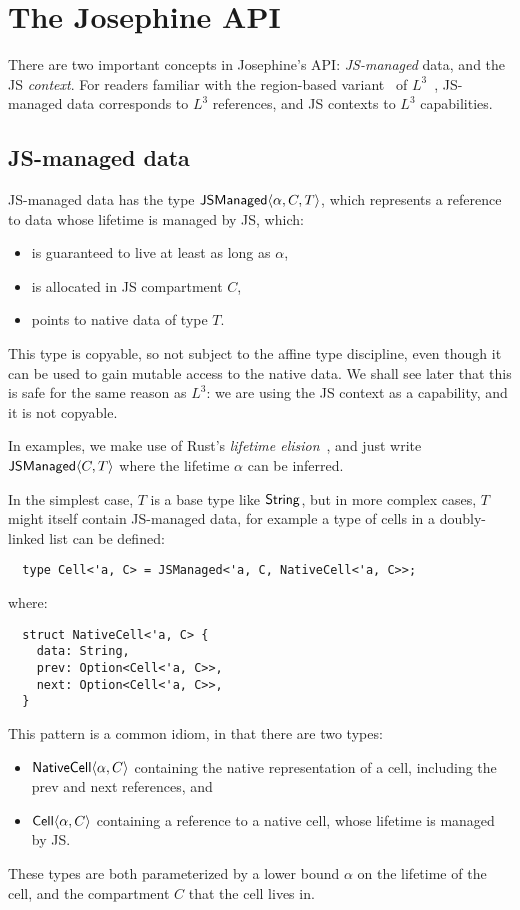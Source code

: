\section{The Josephine API}

There are two important concepts in Josephine's API: \emph{JS-managed} data,
and the JS \emph{context}. For readers familiar with the region-based
variant~\cite{l3-with-regions} of $L^3$~\cite{l3}, JS-managed data
corresponds to $L^3$ references, and JS contexts to $L^3$ capabilities.

\subsection{JS-managed data}

JS-managed data has the type $\mathsf{JSManaged}\langle \alpha, C, T\rangle$, which represents
a reference to data whose lifetime is managed by JS, which:
\begin{itemize}

\item is guaranteed to live at least as long as $\alpha$,
\item is allocated in JS compartment $C$,
\item points to native data of type $T$.
  
\end{itemize}
This type is copyable, so not subject to the affine type discipline,
even though it can be used to gain mutable access to the native
data. We shall see later that this is safe for the same reason as
$L^3$: we are using the JS context as a capability, and it is not
copyable.

In examples, we make use of Rust's \emph{lifetime elision}~\cite{???},
and just write $\mathsf{JSManaged}\langle C,T\rangle$ where the lifetime $\alpha$ can be
inferred.

In the simplest case, $T$ is a base type like $\mathsf{String}$, but in more complex
cases, $T$ might itself contain JS-managed data, for example a type of
cells in a doubly-linked list can be defined:
\begin{verbatim}
  type Cell<'a, C> = JSManaged<'a, C, NativeCell<'a, C>>;
\end{verbatim}
where:
\begin{verbatim}
  struct NativeCell<'a, C> {
    data: String,
    prev: Option<Cell<'a, C>>,
    next: Option<Cell<'a, C>>,
  }
\end{verbatim}
This pattern is a common idiom, in that there are two types:
\begin{itemize}
\item $\mathsf{NativeCell}\langle \alpha,C\rangle$ containing the native representation
of a cell, including the prev and next
references, and
\item $\mathsf{Cell}\langle \alpha,C\rangle$ containing a reference to a native cell,
whose lifetime is managed by JS.
\end{itemize}
These types are both parameterized by a lower bound $\alpha$ on the lifetime
of the cell, and the compartment $C$ that the cell lives in.

